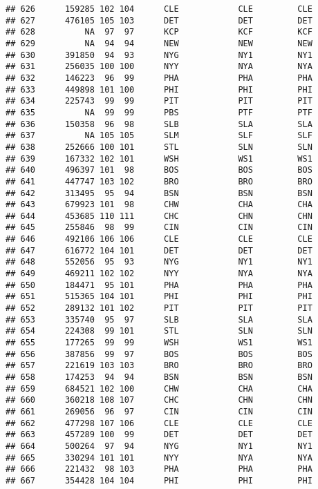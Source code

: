 \documentclass[]{article}
\begin{document}
\begin{verbatim}
## 626      159285 102 104      CLE            CLE         CLE
## 627      476105 105 103      DET            DET         DET
## 628          NA  97  97      KCP            KCF         KCF
## 629          NA  94  94      NEW            NEW         NEW
## 630      391850  94  93      NYG            NY1         NY1
## 631      256035 100 100      NYY            NYA         NYA
## 632      146223  96  99      PHA            PHA         PHA
## 633      449898 101 100      PHI            PHI         PHI
## 634      225743  99  99      PIT            PIT         PIT
## 635          NA  99  99      PBS            PTF         PTF
## 636      150358  96  98      SLB            SLA         SLA
## 637          NA 105 105      SLM            SLF         SLF
## 638      252666 100 101      STL            SLN         SLN
## 639      167332 102 101      WSH            WS1         WS1
## 640      496397 101  98      BOS            BOS         BOS
## 641      447747 103 102      BRO            BRO         BRO
## 642      313495  95  94      BSN            BSN         BSN
## 643      679923 101  98      CHW            CHA         CHA
## 644      453685 110 111      CHC            CHN         CHN
## 645      255846  98  99      CIN            CIN         CIN
## 646      492106 106 106      CLE            CLE         CLE
## 647      616772 104 101      DET            DET         DET
## 648      552056  95  93      NYG            NY1         NY1
## 649      469211 102 102      NYY            NYA         NYA
## 650      184471  95 101      PHA            PHA         PHA
## 651      515365 104 101      PHI            PHI         PHI
## 652      289132 101 102      PIT            PIT         PIT
## 653      335740  95  97      SLB            SLA         SLA
## 654      224308  99 101      STL            SLN         SLN
## 655      177265  99  99      WSH            WS1         WS1
## 656      387856  99  97      BOS            BOS         BOS
## 657      221619 103 103      BRO            BRO         BRO
## 658      174253  94  94      BSN            BSN         BSN
## 659      684521 102 100      CHW            CHA         CHA
## 660      360218 108 107      CHC            CHN         CHN
## 661      269056  96  97      CIN            CIN         CIN
## 662      477298 107 106      CLE            CLE         CLE
## 663      457289 100  99      DET            DET         DET
## 664      500264  97  94      NYG            NY1         NY1
## 665      330294 101 101      NYY            NYA         NYA
## 666      221432  98 103      PHA            PHA         PHA
## 667      354428 104 104      PHI            PHI         PHI

\end{verbatim}
\end{document}
